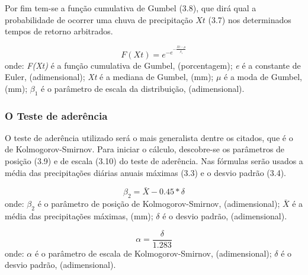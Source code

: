 Por fim tem-se a função cumulativa de Gumbel (3.8), que dirá qual a probabilidade de ocorrer uma chuva de precipitação $Xt$ (3.7) nos determinados tempos de retorno arbitrados.\bigskip

\begin{equation}
F(Xt) = e^{- e^{- \frac{Xt - \mu}{\beta_{1}}}}
\end{equation}
\newline
onde:
\newline
\textit{F(Xt)} é a função cumulativa de Gumbel, (porcentagem);
\newline
\textit{e} é a constante de Euler, (adimensional);
\newline
\textit{Xt} é a mediana de Gumbel, (mm);
\newline
$\mu$ é a moda de Gumbel, (mm);
\newline
$\beta_{1}$ é o parâmetro de escala da distribuição, (adimensional).\bigskip

\subsubsection{O Teste de aderência}\bigskip

O teste de aderência utilizado será o mais generalista dentre os citados, que é o de Kolmogorov-Smirnov. Para iniciar o cálculo, descobre-se os parâmetros de posição (3.9) e de escala (3.10) do teste de aderência. Nas fórmulas serão usados a média das precipitações diárias anuais máximas (3.3) e o desvio padrão (3.4).\bigskip

\begin{equation}
\beta_{2} = \bar{X} - 0.45 * \delta
\end{equation}
\newline
onde:
\newline
$\beta_{2}$ é o parâmetro de posição de Kolmogorov-Smirnov, (adimensional);
\newline
$\bar{X}$ é a média das precipitações máximas, (mm);
\newline
$\delta$ é o desvio padrão, (adimensional).\bigskip

\begin{equation}
\alpha = \frac{\delta}{1.283}
\end{equation}
\newline
onde:
\newline
$\alpha$ é o parâmetro de escala de Kolmogorov-Smirnov, (adimensional);
\newline
$\delta$ é o desvio padrão, (adimensional).\bigskip

